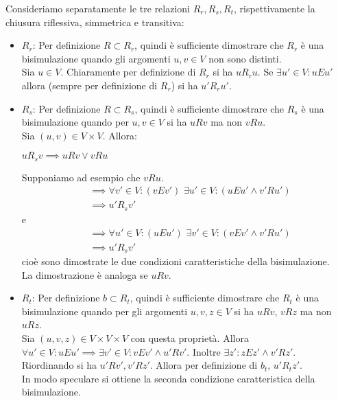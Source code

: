 \begin{proof2}
    Consideriamo separatamente le tre relazioni $R_r, R_s, R_t$, rispettivamente la chiusura riflessiva, simmetrica e transitiva:
    \begin{itemize}
        \item $R_r$: Per definizione $R \subset R_r$, quindi è sufficiente dimostrare che $R_r$ è una bisimulazione quando gli argomenti $u,v \in V$ non sono distinti.\\
        Sia $u \in V$. Chiaramente per definizione di $R_r$ si ha $u R_r u$. Se $\exists u' \in V: u E u'$ allora (sempre per definizione di $R_r$) si ha $u' R_r u'$.
        \item $R_s$: Per definizione $R \subset R_s$, quindi è sufficiente dimostrare che $R_s$ è una bisimulazione quando per $u,v \in V$ si ha $u R v$ ma non $v R u$.\\
        Sia $(u,v) \in V\times V$. Allora:
        \begin{center}
            $u R_s v \implies u R v \lor v R u$
        \end{center}
        Supponiamo ad esempio che $v R u$.
        \begin{align*}
            &\implies \forall v' \in V: (v E v') \,\,\exists u' \in V: (u E u' \land v' R u')\\
            &\implies u' R_s v'
        \end{align*}
        e
        \begin{align*}
            &\implies \forall u' \in V: (u E u') \,\,\exists v' \in V: (v E v' \land v' R u')\\
            &\implies u' R_s v'
        \end{align*}
        cioè sono dimostrate le due condizioni caratteristiche della bisimulazione.\\
        La dimostrazione è analoga se $u R v$.
        \item $R_t$: Per definizione $b \subset R_t$, quindi è sufficiente dimostrare che $R_t$ è una bisimulazione quando per gli argomenti $u,v,z \in V$ si ha $u R v$, $v R z$ ma non $u R z$.\\
        Sia $(u,v,z) \in V\times V\times V$ con questa proprietà. Allora $\forall u' \in V: u E u' \implies \exists v' \in V: v E v' \land u' R v'$. Inoltre $\exists z' : z E z' \land v' R z'$.\\
        Riordinando si ha $u' R v', v' R z'$. Allora per definizione di $b_t, \, u' R_t z'$.\\
        In modo speculare si ottiene la seconda condizione caratteristica della bisimulazione.
    \end{itemize}
    \vspace*{-0.75cm}
\end{proof2}
